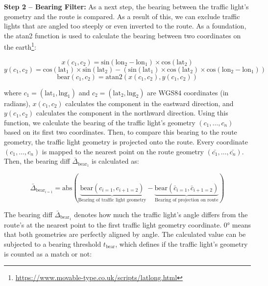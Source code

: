 \textbf{\color{cidarkblue}Step 2 -- Bearing Filter:} As a next step, the bearing between the traffic light's geometry and the route is compared. As a result of this, we can exclude traffic lights that are angled too steeply or even inverted to the route. As a foundation, the atan2 function is used to calculate the bearing between two coordinates on the earth\footnote{\url{https://www.movable-type.co.uk/scripts/latlong.html}}:

\begin{equation}
x(c_1, c_2) = \text{sin}(\text{lon}_2 - \text{lon}_1) \times \text{cos}(\text{lat}_2)
\end{equation}
\begin{equation}
y(c_1, c_2) = \text{cos}(\text{lat}_1) \times \text{sin}(\text{lat}_2) - (\text{sin}(\text{lat}_1) \times \text{cos}(\text{lat}_2) \times \text{cos}(\text{lon}_2 - \text{lon}_1))
\end{equation}
\begin{equation}
\text{bear}(c_1, c_2) = \text{atan2}(x(c_1, c_2), y(c_1, c_2))
\end{equation}

where $c_1 = (\text{lat}_1, \text{lng}_1)$ and $c_2 = (\text{lat}_2, \text{lng}_2)$ are WGS84 coordinates (in radians), $x(c_1, c_2)$ calculates the component in the eastward direction, and $y(c_1, c_2)$ calculates the component in the northward direction. Using this function, we calculate the bearing of the traffic light's geometry $(c_1, \dots, c_n)$ based on its first two coordinates. Then, to compare this bearing to the route geometry, the traffic light geometry is projected onto the route. Every coordinate $(c_1, \dots, c_n)$ is mapped to the nearest point on the route geometry $(\bar{c_1}, \dots, \bar{c_n})$. Then, the bearing diff $\bar{\Delta}_{\text{bear}_1}$ is calculated as:

\begin{equation}
    \bar{\Delta}_{\text{bear}_{i=1}} = 
        \text{abs}(\underbrace{\text{bear}(c_{i=1}, c_{i+1=2})}_{\text{Bearing of traffic light geometry}} - \underbrace{\text{bear}(\bar{c}_{i=1}, \bar{c}_{i+1=2})}_{\text{Bearing of projection on route}})
\end{equation}

The bearing diff $\bar{\Delta}_{\text{bear}_1}$ denotes how much the traffic light's angle differs from the route's at the nearest point to the first traffic light geometry coordinate. 0° means that both geometries are perfectly aligned by angle. The calculated value can be subjected to a bearing threshold $t_{\text{bear}}$, which defines if the traffic light's geometry is counted as a match or not:


